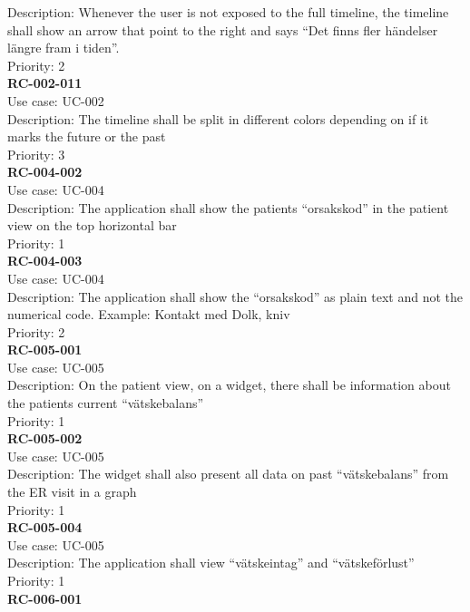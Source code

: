 Description: Whenever the user is not exposed to the full timeline, the timeline shall show an arrow that point to the right and says “Det finns fler händelser längre fram i tiden”. \\
Priority: 2 \\
\newline
\textbf{RC-002-011} \\
Use case: UC-002 \\
Description: The timeline shall be split in different colors depending on if it marks the future or the past\\
Priority: 3\\
\newline
\textbf{RC-004-002} \\
Use case: UC-004 \\
Description: The application shall show the patients “orsakskod” in the patient view on the top horizontal bar \\
Priority: 1 \\
\newline
\textbf{RC-004-003} \\
Use case: UC-004 \\
Description: The application shall show the “orsakskod” as plain text and not the numerical code. Example: Kontakt med Dolk, kniv \\
Priority: 2 \\
\newline
\textbf{RC-005-001} \\
Use case: UC-005 \\
Description: On the patient view, on a widget, there shall be information about the patients current “vätskebalans” \\
Priority: 1 \\
\newline
\textbf{RC-005-002} \\
Use case: UC-005 \\
Description: The widget shall also present all data on past “vätskebalans” from the ER visit in a graph\\
Priority: 1 \\
\newline
\textbf{RC-005-004} \\
Use case: UC-005 \\
Description: The application shall view “vätskeintag” and “vätskeförlust” \\
Priority: 1 \\
\newline
\textbf{RC-006-001} \\
